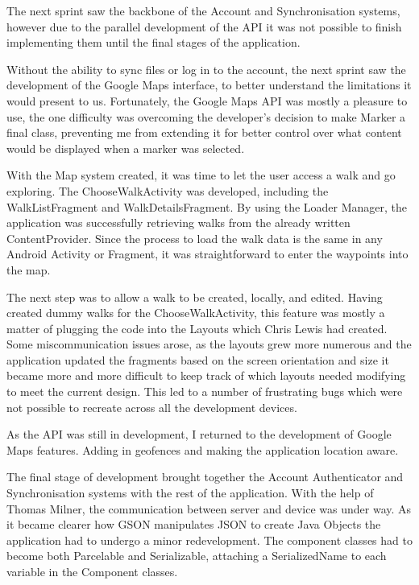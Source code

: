 \documentclass[11pt,a4paper]{report}
\begin{document}
The next sprint saw the backbone of the Account and Synchronisation systems, however due to the parallel development of the API it was not possible to finish implementing them until the final stages of the application.

Without the ability to sync files or log in to the account, the next sprint saw the development of the Google Maps interface, to better understand the limitations it would present to us. Fortunately, the Google Maps API was mostly a pleasure to use, the one difficulty was overcoming the developer's decision to make Marker a final class, preventing me from extending it for better control over what content would be displayed when a marker was selected.

With the Map system created, it was time to let the user access a walk and go exploring. The ChooseWalkActivity was developed, including the WalkListFragment and WalkDetailsFragment. By using the Loader Manager, the application was successfully retrieving walks from the already written ContentProvider. Since the process to load the walk data is the same in any Android Activity or Fragment, it was straightforward to enter the waypoints into the map. 

The next step was to allow a walk to be created, locally, and edited. Having created dummy walks for the ChooseWalkActivity, this feature was mostly a matter of plugging the code into the Layouts which Chris Lewis had created. Some miscommunication issues arose, as the layouts grew more numerous and the application updated the fragments based on the screen orientation and size it became more and more difficult to keep track of which layouts needed modifying to meet the current design. This led to a number of frustrating bugs which were not possible to recreate across all the development devices.

As the API was still in development, I returned to the development of Google Maps features. Adding in geofences and making the application location aware.

The final stage of development brought together the Account Authenticator and Synchronisation systems with the rest of the application. With the help of Thomas Milner, the communication between server and device was under way. As it became clearer how GSON manipulates JSON to create Java Objects the application had to undergo a minor redevelopment. The component classes had to become both Parcelable and Serializable, attaching a SerializedName to each variable in the Component classes.
\end{document}
